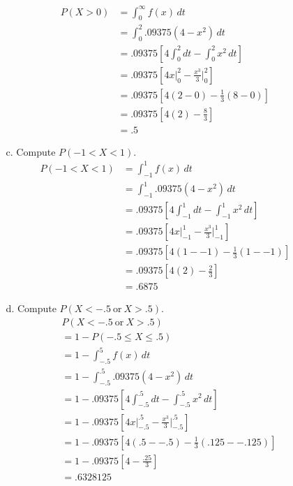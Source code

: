\documentclass[letterpaper,12pt]{article}
\begin{document}
\begin{enumerate}
\begin{enumerate}
\begin{align*}
          P(X > 0) &= \int_{0}^{\infty} f(x)\,dt \\
          &= \int_{0}^{2} .09375(4 - x^2)\,dt \\
          &= .09375\left[4\int_{0}^{2} dt - \int_{0}^{2} x^2\,dt\right] \\
          &= .09375\left[4x\big\rvert_{0}^{2} - \frac{x^3}{3}\bigg\rvert_{0}^{2}\right]  \\
          &= .09375\left[4(2 - 0) - \frac{1}{3}(8 - 0)\right] \\
          &= .09375\left[4(2) - \frac{8}{3}\right] \\
          &= .5
        \end{align*}
      \item[c.]
        Compute $P(-1 < X < 1)$.
        \begin{align*}
          P(-1 < X < 1) &= \int_{-1}^{1} f(x)\,dt \\
          &= \int_{-1}^{1} .09375(4 - x^2)\,dt \\
          &= .09375\left[4\int_{-1}^{1} dt - \int_{-1}^{1} x^2\,dt\right] \\
          &= .09375\left[4x\big\rvert_{-1}^{1} - \frac{x^3}{3}\bigg\rvert_{-1}^{1}\right]  \\
          &= .09375\left[4(1 - -1) - \frac{1}{3}(1 - -1)\right] \\
          &= .09375\left[4(2) - \frac{2}{3}\right] \\
          &= .6875
        \end{align*}
      \item[d.]
        Compute $P(X < -.5\ \text{or}\ X > .5)$.
        \begin{align*}
          &P(X < -.5\ \text{or}\ X > .5) \\
          &= 1 - P(-.5 \le X \le .5) \\
          &= 1 - \int_{-.5}^{5} f(x)\,dt \\
          &= 1 - \int_{-.5}^{.5} .09375(4 - x^2)\,dt \\
          &= 1 - .09375\left[4\int_{-.5}^{.5} dt - \int_{-.5}^{.5} x^2\,dt\right] \\
          &= 1 - .09375\left[4x\big\rvert_{-.5}^{.5} - \frac{x^3}{3}\bigg\rvert_{-.5}^{.5}\right]  \\
          &= 1 - .09375\left[4(.5 - -.5) - \frac{1}{3}(.125 - -.125)\right] \\
          &= 1 - .09375\left[4 - \frac{.25}{3}\right] \\
          &= .6328125
        \end{align*}

\end{enumerate}
\end{enumerate}
\end{document}
